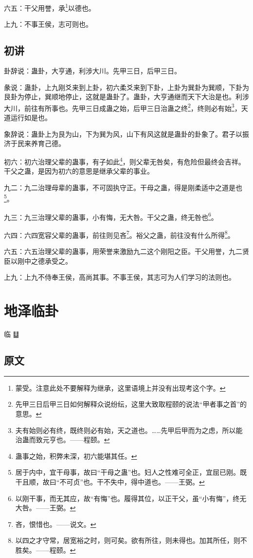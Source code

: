 \documentclass[12pt,oneside]{book}
\begin{document}
六五：干父用誉，承\footnote{蒙受。注意此处不要解释为继承，这里语境上并没有出现考这个字。}以德也。

上九：不事王侯，志可则也。

\section{初讲}
卦辞说：蛊卦，大亨通，利涉大川。先甲三日，后甲三日。

彖说：蛊卦，上九刚爻来到上卦，初六柔爻来到下卦，上卦为巽卦为巽顺，下卦为艮卦为停止，巽顺地停止，这就是蛊卦了。蛊卦，大亨通继而天下大治是也。利涉大川，前往有所事也。先甲三日成蛊之始，后甲三日治蛊之终\footnote{先甲三日后甲三日如何解释众说纷纭，这里大致取程颐的说法“甲者事之首”的意思。}，终则必有始\footnote{夫有始则必有终，既终则必有始，天之道也。……先甲后甲而为之虑，所以能治蛊而致元亨也。——程颐。}，天道运行如是也。

象辞说：蛊卦上为艮为山，下为巽为风，山下有风这就是蛊卦的卦象了。君子以振济于民来养育己德。

初六：初六治理父辈的蛊事，有子如此\footnote{蛊事之始，积弊未深，初六能堪其任。}，则父辈无咎矣，有危险但最终会吉祥。干父之蛊，是因为初六的意思是继承父辈的事业。

九二：九二治理母辈的蛊事，不可固执守正。干母之蛊，得是刚柔适中之道是也\footnote{居于内中，宜干母事，故曰“干母之蛊”也。妇人之性难可全正，宜屈已刚。既干且顺，故曰“不可贞”也。干不失中，得中道也。——王弼。}。

九三：九三治理父辈的蛊事，小有悔，无大咎。干父之蛊，终无咎也\footnote{以刚干事，而无其应，故“有悔”也。履得其位，以正干父，虽“小有悔”，终无大咎。——王弼。}。

六四：六四宽容父辈的蛊事，前往则见吝\footnote{吝，恨惜也。——说文。}。裕父之蛊，前往没有什么所得\footnote{以四之才守常，居宽裕之时，则可矣。欲有所往，则未得也。加其所任，则不胜矣。——程颐。}。

六五：六五治理父辈的蛊事，用荣誉来激励九二这个刚阳之臣。干父用誉，九二贤臣以刚中之德承受之。

上九：上九不侍奉王侯，高尚其事。不事王侯，其志可为人们学习的法则也。



\chapter{地泽临卦}
临 {\Large ䷒}

\section{原文}
\end{document}

